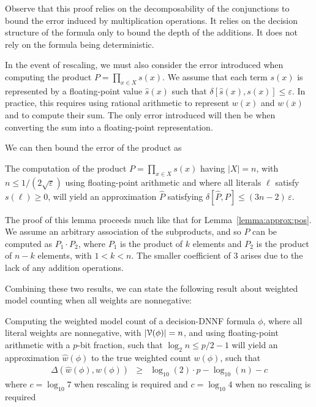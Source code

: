 \documentclass[letterpaper,USenglish,cleveref, autoref, thm-restate]{lipics-v2021}
\newcommand{\obar}[1]{\overline{#1}}
\newcommand{\lit}{\ell}
\newcommand{\approximate}[1]{\hat{#1}}
\newcommand{\approxP}{\approximate{P}}
\newcommand{\approxw}{\approximate{w}}
\newcommand{\approxs}{\approximate{s}}
\newcommand{\aerror}{\delta}
\newcommand{\digitprecision}{\Delta}
\newcommand{\roundepsilon}{\varepsilon}
\newcommand{\varset}{X}
\newcommand{\dependencyset}{{\cal V}}
\begin{document}
Observe that this proof relies on the decomposability of the
conjunctions to bound the error induced by multiplication operations.
It relies on the decision structure of the formula only to bound the
depth of the additions.  It does not rely on the formula being deterministic.

In the event of rescaling, we must also consider the error introduced
when computing the product $P = \prod_{x\in\varset} s(x)$.  We assume that
each term $s(x)$ is represented by a floating-point value
$\approxs(x)$ such that $\aerror[\approxs(x), s(x)] \leq
\roundepsilon$.  In practice, this requires using rational arithmetic
to represent $w(x)$ and $w(\obar{x})$ and to compute their sum.  The
only error introduced will then be when converting the sum into
a floating-point representation.

We can then bound the error of the product as
\begin{lemma}
  The computation of the product $P = \prod_{x\in\varset} s(x)$ having
$|\varset| = n$, with $n \leq 1/(2\sqrt{\roundepsilon})$ using floating-point arithmetic
and where all literals $\ell$ satisfy $s(\lit) \geq 0$,
will yield an approximation $\approxP$ satisfying
  $\aerror[\approxP, P] \leq (3n-2)\,\roundepsilon$.
  \label{lemma:approx:product}
\end{lemma}

The proof of this lemma proceeds much like that for Lemma~\ref{lemma:approx:pos}.  We assume an arbitrary association of the subproducts, and so $P$ can be computed as
$P_1 \cdot P_2$, where $P_1$ is the product of $k$ elements and $P_2$ is the product of $n-k$ elements, with $1 < k < n$.
The smaller coefficient of $3$ arises due to the lack of any addition operations.

Combining these two results, we can state the following result about weighted model counting when all weights are nonnegative:
\begin{theorem}
  \label{thm:approx:pos}
Computing the weighted model count of
a decision-DNNF formula $\phi$, where all literal weights are nonnegative, with $|\dependencyset(\phi)| = n$, and using floating-point arithmetic with a $p$-bit fraction, such that $\log_2 n \leq p/2-1$
will yield an approximation $\approxw(\phi)$ to the true weighted count $w(\phi)$, such that
\begin{eqnarray}
\digitprecision(\approxw(\phi), w(\phi)) & \geq & \log_{10}(2)\cdot p - \log_{10}(n) - c\label{eqn:precision:wmc}
\end{eqnarray}
where $c = \log_{10} 7$ when rescaling is required and $c = \log_{10} 4$ when no rescaling is required
\end{theorem}
\end{document}
